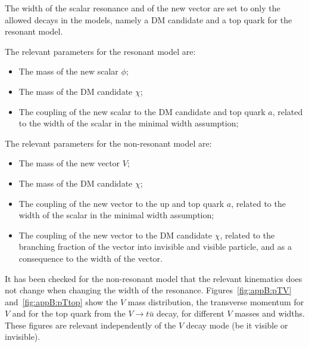 The width of the scalar resonance and of the new vector are set to only the allowed decays in the models,
namely a DM candidate and a top quark for the resonant model. 




The relevant parameters for the resonant model are:
\begin{itemize}
	\item The mass of the new scalar $\phi$;
	\item The mass of the DM candidate $\chi$;
	\item The coupling of the new scalar to the DM candidate and top quark $a$, 
	related to the width of the scalar in the minimal width assumption;
\end{itemize}	

The relevant parameters for the non-resonant model are:
\begin{itemize}
	\item The mass of the new vector $V$;
	\item The mass of the DM candidate $\chi$;
	\item The coupling of the new vector to the up and top quark $a$, 
	related to the width of the scalar in the minimal width assumption;
	\item The coupling of the new vector to the DM candidate $\chi$, 
	related to the branching fraction of the vector into invisible and visible particle,
	and as a consequence to the width of the vector. 
\end{itemize}	

It has been checked for the non-resonant model that the relevant kinematics does not change when changing the width of the resonance. Figures~\ref{fig:appB:pTV} and~\ref{fig:appB:pTtop} show the $V$ mass distribution, the transverse momentum for $V$ and for the top quark from the $V\to t\bar{u}$ decay, for different $V$ masses and widths.
These figures are relevant independently of the $V$ decay mode (be it visible or invisible). 

